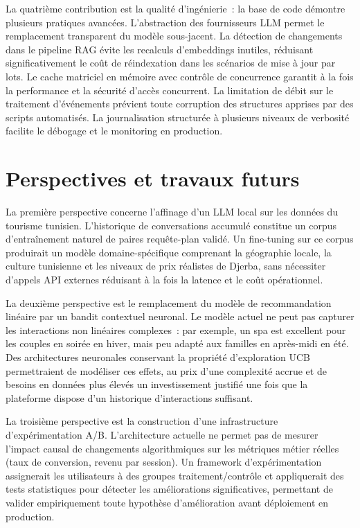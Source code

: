 La quatrième contribution est la qualité d'ingénierie~: la base de 
code démontre plusieurs pratiques avancées. L'abstraction des 
fournisseurs LLM permet le remplacement transparent du modèle 
sous-jacent. La détection de changements dans le pipeline RAG évite 
les recalculs d'embeddings inutiles, réduisant significativement le 
coût de réindexation dans les scénarios de mise à jour par lots. Le 
cache matriciel en mémoire avec contrôle de concurrence garantit à 
la fois la performance et la sécurité d'accès concurrent. La 
limitation de débit sur le traitement d'événements prévient toute 
corruption des structures apprises par des scripts automatisés. La 
journalisation structurée à plusieurs niveaux de verbosité facilite 
le débogage et le monitoring en production.


\section*{Perspectives et travaux futurs}

La première perspective concerne l'affinage d'un LLM local sur les 
données du tourisme tunisien. L'historique de conversations accumulé 
constitue un corpus d'entraînement naturel de paires requête-plan 
validé. Un fine-tuning sur ce corpus produirait un modèle 
domaine-spécifique comprenant la géographie locale, la culture 
tunisienne et les niveaux de prix réalistes de Djerba, sans 
nécessiter d'appels API externes   réduisant à la fois la latence 
et le coût opérationnel.

La deuxième perspective est le remplacement du modèle de recommandation 
linéaire par un bandit contextuel neuronal. Le modèle actuel ne peut 
pas capturer les interactions non linéaires complexes~: par exemple, 
un spa est excellent pour les couples en soirée en hiver, mais peu 
adapté aux familles en après-midi en été. Des architectures neuronales 
conservant la propriété d'exploration UCB permettraient de modéliser 
ces effets, au prix d'une complexité accrue et de besoins en données 
plus élevés   un investissement justifié une fois que la plateforme 
dispose d'un historique d'interactions suffisant.

La troisième perspective est la construction d'une infrastructure 
d'expérimentation A/B. L'architecture actuelle ne permet pas de 
mesurer l'impact causal de changements algorithmiques sur les 
métriques métier réelles (taux de conversion, revenu par session). 
Un framework d'expérimentation assignerait les utilisateurs à des 
groupes traitement/contrôle et appliquerait des tests statistiques 
pour détecter les améliorations significatives, permettant de valider 
empiriquement toute hypothèse d'amélioration avant déploiement en 
production.

